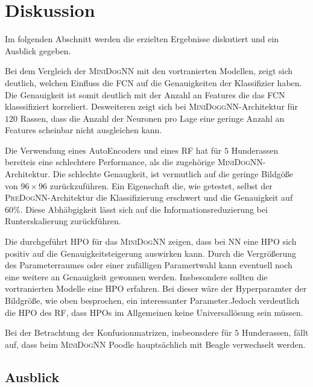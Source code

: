 \section{Diskussion}
Im folgenden Abschnitt werden die erzielten Ergebnisse diskutiert und
ein Ausblick gegeben.

Bei dem Vergleich der \textsc{MiniDogNN} mit den vortranierten Modellen,
zeigt sich deutlich, welchen Einfluss die FCN auf die Genauigkeiten der
Klassifizier haben. Die Genauigkeit ist somit deutlich mit der Anzahl an Features
die das FCN klasssifiziert korreliert. Desweiteren zeigt sich bei \textsc{MiniDoggNN}-Architektur
für $120$ Rassen, dass die Anzahl der Neuronen pro Lage eine geringe Anzahl an
Features scheinbar nicht ausgleichen kann.

Die Verwendung eines AutoEncoders und eines RF hat für $5$ Hunderassen bereiteis
eine schlechtere Performance, als die zugehörige \textsc{MiniDogNN}-Architektur.
Die schlechte Genaugkeit, ist vermutlich auf die geringe Bildgöße von $96\times96$
zurückzuführen. Ein Eigenschaft die, wie getestet, selbst der \textsc{PreDogNN}-Architektur
die Klassifizierung erschwert und die Genauigkeit auf $60\%$. Diese Abhäbgigkeit
lässt sich auf die Informationsreduzierung bei Runterskalierung zurückführen.

Die durchgeführt HPO für das \textsc{MiniDogNN} zeigen, dass bei NN eine HPO
sich positiv auf die Genauigkeitsteigerung auswirken kann. Durch die Vergrößerung
des Parameterraumes oder einer zufälligen Paramertwahl kann eventuell noch eine
weitere an Genauigkeit gewonnen werden. Insbesondere sollten die vortranierten
Modelle eine HPO erfahren. Bei dieser wäre der Hyperparamter der Bildgröße,
wie oben besprochen, ein interessanter Parameter.Jedoch verdeutlich
die HPO des RF, dass HPOs im Allgemeinen keine Universallösung sein müssen.

Bei der Betrachtung der Konfusionmatrizen, insbeonsdere für $5$ Hunderassen,
fällt auf, dass beim \textsc{MiniDogNN} Poodle hauptsächlich mit Beagle verwechselt
werden. 




\subsection{Ausblick}
